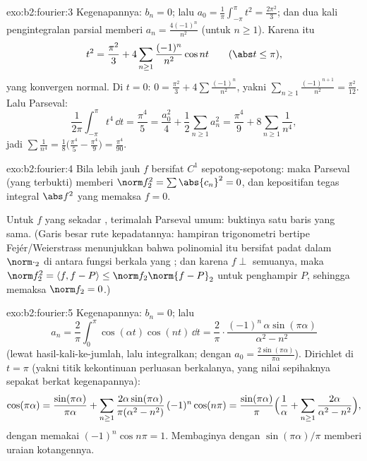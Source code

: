 \begin{solution}{exo:b2:fourier:3}
Kegenapannya: $b_n = 0$; lalu $a_0 = \frac{1}{\pi}\int_{-\pi}^{\pi} t^2 =
\frac{2\pi^2}{3}$; dan dua kali pengintegralan parsial memberi $a_n =
\frac{4(-1)^n}{n^2}$ (untuk $n \geq 1$). Karena itu
\[
t^2 = \frac{\pi^2}{3} + 4\sum_{n\geq1}
\frac{(-1)^n}{n^2}\cos nt
\qquad (\abs t \leq \pi),
\]
yang konvergen normal. Di $t = 0$: $0 = \frac{\pi^2}{3} +
4\sum\frac{(-1)^n}{n^2}$, yakni $\sum_{n\geq1}
\frac{(-1)^{n+1}}{n^2} = \frac{\pi^2}{12}$. Lalu Parseval:
\[
\frac{1}{2\pi}\int_{-\pi}^{\pi} t^4\,\dd t = \frac{\pi^4}{5}
= \frac{a_0^2}{4} + \frac12\sum_{n\geq1} a_n^2
= \frac{\pi^4}{9} + 8\sum_{n\geq1}\frac{1}{n^4} ,
\]
jadi $\sum \frac{1}{n^4} = \frac18\bigl(\frac{\pi^4}{5} -
\frac{\pi^4}{9}\bigr) = \frac{\pi^4}{90}$.
\end{solution}

\begin{solution}{exo:b2:fourier:4}
Bila lebih jauh $f$ bersifat $C^1$ sepotong-sepotong: maka Parseval (yang terbukti) memberi
$\norm f_2^2 = \sum\abs{c_n}^2 = 0$, dan kepositifan tegas
integral $\abs f^2$ yang  memaksa $f = 0$.

Untuk $f$ yang sekadar , terimalah Parseval umum: buktinya
satu baris yang sama. (Garis besar rute kepadatannya: hampiran
trigonometri bertipe Fejér/Weierstrass menunjukkan bahwa polinomial itu
bersifat padat dalam $\norm\cdot_2$ di antara fungsi berkala yang ; dan karena $f
\perp$ semuanya, maka $\norm f_2^2 = \langle f, f - P\rangle \leq
\norm f_2\norm{f - P}_2$ untuk penghampir $P$, sehingga memaksa $\norm f_2 =
0$.)
\end{solution}

\begin{solution}{exo:b2:fourier:5}
Kegenapannya: $b_n = 0$; lalu
\[
a_n = \frac{2}{\pi}\int_0^\pi \cos(\alpha t)\cos(nt)\,\dd t
= \frac{2}{\pi}\cdot
\frac{(-1)^n\,\alpha\sin(\pi\alpha)}{\alpha^2 - n^2}
\]
(lewat hasil-kali-ke-jumlah, lalu integralkan; dengan $a_0 =
\frac{2\sin(\pi\alpha)}{\pi\alpha}$). Dirichlet di $t = \pi$ (yakni
titik kekontinuan perluasan berkalanya, yang nilai sepihaknya
sepakat berkat kegenapannya):
\[
\cos(\pi\alpha)
= \frac{\sin(\pi\alpha)}{\pi\alpha}
+ \sum_{n\geq1} \frac{2\alpha\sin(\pi\alpha)}{\pi(\alpha^2 -
n^2)}\,(-1)^n\cos(n\pi)
= \frac{\sin(\pi\alpha)}{\pi}\Bigl(\frac{1}{\alpha} +
\sum_{n\geq1}\frac{2\alpha}{\alpha^2 - n^2}\Bigr),
\]
dengan memakai $(-1)^n\cos n\pi = 1$. Membaginya dengan $\sin(\pi\alpha)/\pi$
memberi uraian kotangennya.
\end{solution}

